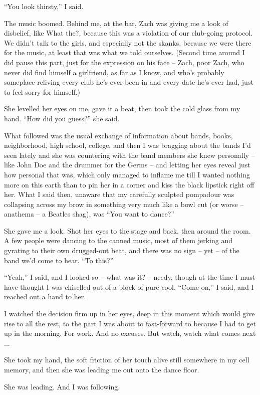 \documentclass[11pt,a4paper]{article}
\newcommand{\qm}[1]{“#1”}
\begin{document}
\qm{You look thirsty,} I said.

The music boomed. Behind me, at the bar, Zach was giving me a look of disbelief, like What the?, because this was a violation of our club-going protocol. We didn't talk to the girls, and especially not the skanks, because we were there for the music, at least that was what we told ourselves. (Second time around I did pause this part, just for the expression on his face – Zach, poor Zach, who never did find himself a girlfriend, as far as I know, and who's probably someplace reliving every club he's ever been in and every date he's ever had, just to feel sorry for himself.)

She levelled her eyes on me, gave it a beat, then took the cold glass from my hand. \qm{How did you guess?} she said.

What followed was the usual exchange of information about bands, books, neighborhood, high school, college, and then I was bragging about the bands I'd seen lately and she was countering with the band members she knew personally – like John Doe and the drummer for the Germs – and letting her eyes reveal just how personal that was, which only managed to inflame me till I wanted nothing more on this earth than to pin her in a corner and kiss the black lipstick right off her. What I said then, unaware that my carefully sculpted pompadour was collapsing across my brow in something very much like a bowl cut (or worse – anathema – a Beatles shag), was \qm{You want to dance?}

She gave me a look. Shot her eyes to the stage and back, then around the room. A few people were dancing to the canned music, most of them jerking and gyrating to their own drugged-out beat, and there was no sign – yet – of the band we'd come to hear. \qm{To this?}

\qm{Yeah,} I said, and I looked so – what was it? – needy, though at the time I must have thought I was chiselled out of a block of pure cool. \qm{Come on,} I said, and I reached out a hand to her.

I watched the decision firm up in her eyes, deep in this moment which would give rise to all the rest, to the part I was about to fast-forward to because I had to get up in the morning. For work. And no excuses. But watch, watch what comes next ...

She took my hand, the soft friction of her touch alive still somewhere in my cell memory, and then she was leading me out onto the dance floor.

She was leading. And I was following.
\end{document}
